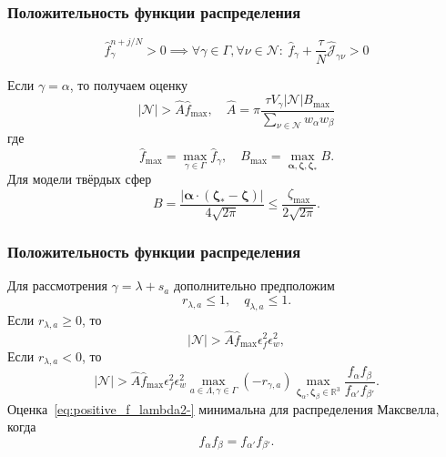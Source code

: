 \documentclass[mathserif]{beamer} %
\newcommand{\bzeta}{\boldsymbol{\zeta}}
\newcommand{\Nu}{\mathcal{N}}
\begin{document}
\begin{frame}
    \frametitle{Положительность функции распределения}
    \begin{block}{}
        \vspace{-5pt}
        \begin{equation}\label{eq:positive_f}
            \hat{f}_\gamma^{n+j/N} > 0 \implies \forall \gamma\in\Gamma, \forall\nu\in\Nu\!: \
                \hat{f}_\gamma + \frac{\tau}{N}\hat{\mathscr{J}}_{\gamma\nu} > 0
        \end{equation}
        \vspace{-10pt}
    \end{block}
    \vspace{20pt}\pause

    Если \(\gamma = \alpha\), то получаем оценку
    \begin{equation}\label{eq:positive_f_alpha}
        |\Nu| > \hat{A} \hat{f}_{\max}, \quad
        \hat{A} = \pi\frac{\tau V_\gamma|\Nu| B_{\max}}{\sum_{\nu\in\Nu} w_{\alpha}w_{\beta}}
    \end{equation}
    где
    \begin{equation}\label{eq:hat_f_max}
        \hat{f}_{\max} = \max_{\gamma\in\Gamma} \hat{f}_\gamma, \quad
        B_{\max} = \max_{\boldsymbol\alpha, \bzeta, \bzeta_*} B.
    \end{equation}
    Для модели твёрдых сфер
    \begin{equation}\label{eq:B_HS}
        B = \frac{|\boldsymbol\alpha\cdot(\bzeta_*-\bzeta)|}{4\sqrt{2\pi}} \leq \frac{\zeta_{\max}}{2\sqrt{2\pi}}.
    \end{equation}
\end{frame}

\begin{frame}
    \frametitle{Положительность функции распределения}
    Для рассмотрения \(\gamma = \lambda+s_a\) дополнительно предположим
    \begin{equation}\label{eq:normal_stencil}
        r_{\lambda,a} \leq 1, \quad q_{\lambda,a} \leq 1.
    \end{equation}
    Если \(r_{\lambda,a} \geq 0\), то
    \begin{equation}\label{eq:positive_f_lambda2+}
        |\Nu| > \hat{A} \hat{f}_{\max} \epsilon_f^2 \epsilon_w^2,
    \end{equation}
    Если \(r_{\lambda,a} < 0\), то
    \begin{equation}\label{eq:positive_f_lambda2-}
        |\Nu| > \hat{A} \hat{f}_{\max} \epsilon_f^2 \epsilon_w^2
            \max_{a\in\Lambda,\gamma\in\Gamma}\left(-r_{\gamma,a}\right)
            \max_{\bzeta_\alpha,\bzeta_\beta\in\mathbb{R}^3}
            \frac{f_{\alpha}f_{\beta}}{f_{\alpha'}f_{\beta'}}.
    \end{equation}
    Оценка~\eqref{eq:positive_f_lambda2-} минимальна для распределения Максвелла, когда
    \begin{equation}
        f_{\alpha}f_{\beta} = f_{\alpha'}f_{\beta'}.
    \end{equation}
\end{frame}
\end{document}
